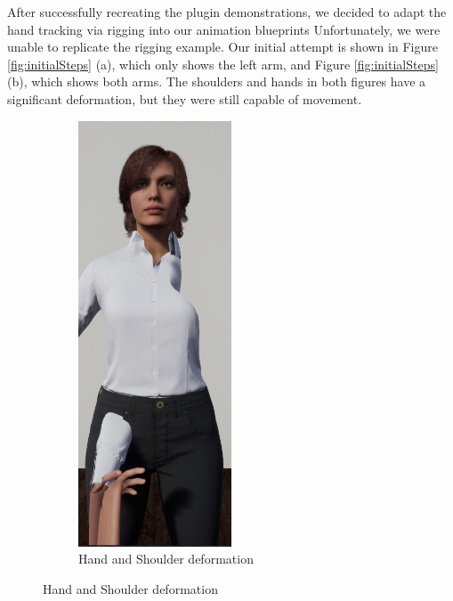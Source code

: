 After successfully recreating the plugin demonstrations, we decided to adapt the hand tracking via rigging into our animation blueprints Unfortunately, we were unable to replicate the rigging example. Our initial attempt is shown in Figure \ref{fig:initialSteps} (a), which only shows the left arm, and Figure \ref{fig:initialSteps} (b), which shows both arms. The shoulders and hands in both figures have a significant deformation, but they were still capable of movement.

\begin{figure}[!htb]
    \begin{minipage}{\linewidth}
        \centering
        \begin{subfigure}{0.49\textwidth}
            \centering
            \includegraphics[width=0.5\textwidth]{figures/issue.png}
            \caption{Hand and Shoulder deformation}
        \end{subfigure}

\end{minipage}
\end{figure}
